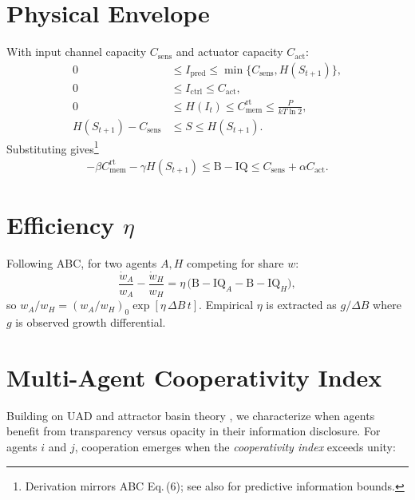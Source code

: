 \documentclass[10pt,conference]{IEEEtran}
\begin{document}
\section{Physical Envelope}
\label{sec:bounds}
With input channel capacity \(C_{\mathrm{sens}}\) and actuator capacity \(C_{\mathrm{act}}\):
\begin{equation}
\begin{aligned}
0 &\le I_{\mathrm{pred}}\le \min\!\bigl\{C_{\mathrm{sens}},H(S_{t+1})\bigr\},\\
0 &\le I_{\mathrm{ctrl}}\le C_{\mathrm{act}},\\
0 &\le H(I_t)\le C_{\mathrm{mem}}^{\mathrm{rt}}
      \le \frac{P}{kT\ln2},\\
H(S_{t+1})-C_{\mathrm{sens}} &\le S\le H(S_{t+1}).
\end{aligned}
\end{equation}
Substituting gives\footnote{Derivation mirrors ABC Eq.\,(6); see also \cite{Tishby2000IB} for predictive information bounds.}
\begin{align}
-\beta C_{\mathrm{mem}}^{\mathrm{rt}}-\gamma H(S_{t+1})
\le \mathrm{B\!-\!IQ}
\le C_{\mathrm{sens}}+\alpha C_{\mathrm{act}}.
\end{align}

\section{Efficiency $\eta$}
Following ABC, for two agents \(A,H\) competing for share \(w\):
\begin{equation}
\frac{\dot w_A}{w_A}-\frac{\dot w_H}{w_H}
=\eta\,\bigl(\mathrm{B\!-\!IQ}_A-\mathrm{B\!-\!IQ}_H\bigr),
\end{equation}
so
\(
w_A/w_H
\!=\!(w_A/w_H)_0 \exp[\eta\,\Delta B\,t].
\)
Empirical \(\eta\) is extracted as \(g/\Delta B\) where \(g\) is observed growth differential.

\section{Multi-Agent Cooperativity Index}
\label{sec:cooperativity}

Building on UAD and attractor basin theory \cite{uad2025, abc2025}, we characterize when agents benefit from transparency versus opacity in their information disclosure. 
For agents \(i\) and \(j\), cooperation emerges when the \emph{cooperativity index} exceeds unity:
\end{document}
